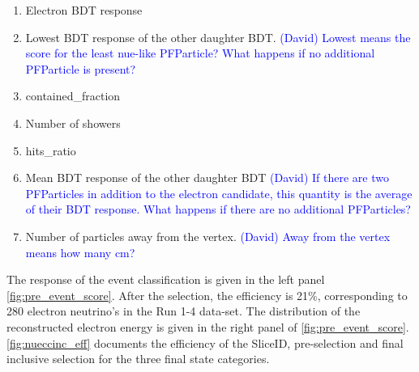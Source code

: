 \begin{enumerate}
    \item Electron BDT response
    \item Lowest BDT response of the other daughter BDT. \textcolor{blue}{(David) Lowest means the score for the least nue-like PFParticle? What happens if no additional PFParticle is present?}
    \item contained\_fraction
    \item Number of showers
    \item hits\_ratio
    \item Mean BDT response of the other daughter BDT \textcolor{blue}{(David) If there are two PFParticles in addition to the electron candidate, this quantity is the average of their BDT response. What happens if there are no additional PFParticles?}
    \item Number of particles away from the vertex. \textcolor{blue}{(David) Away from the vertex means how many cm?}
\end{enumerate}
The response of the event classification is given in the left panel \cref{fig:pre_event_score}. After the selection, the efficiency is 21\%, corresponding to 280 electron neutrino's in the Run 1-4 data-set. The distribution of the reconstructed electron energy is given in the right panel of \cref{fig:pre_event_score}. \cref{fig:nueccinc_eff} documents the efficiency of the SliceID, pre-selection and final inclusive selection for the three final state categories.



